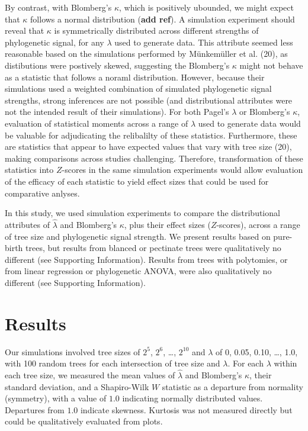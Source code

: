 \documentclass[]{article}
\begin{document}
By contrast, with Blomberg's \(\kappa\), which is positively ubounded,
we might expect that \(\kappa\) follows a normal distribution
(\textbf{add ref}). A simulation experiment should reveal that
\(\kappa\) is symmetrically distributed across different strengths of
phylogenetic signal, for any \(\lambda\) used to generate data. This
attribute seemed less reasonable based on the simulations performed by
Münkemüller et al. (20), as distibutions were postively skewed,
suggesting the Blomberg's \(\kappa\) might not behave as a statistic
that follows a noraml distribution. However, because their simulations
used a weighted combination of simulated phylogenetic signal strengths,
strong inferences are not possible (and distributional attributes were
not the intended result of their simulations). For both Pagel's
\(\lambda\) or Blomberg's \(\kappa\), evaluation of statistical moments
across a range of \(\lambda\) used to generate data would be valuable
for adjudicating the relibalilty of these statistics. Furthermore, these
are statistics that appear to have expected values that vary with tree
size (20), making comparisons across studies challenging. Therefore,
transformation of these statistics into \(Z\)-scores in the same
simulation experiments would allow evaluation of the efficacy of each
statistic to yield effect sizes that could be used for comparative
anlyses. \hfill\break

In this study, we used simulation experiments to compare the
distributional attributes of \(\hat{\lambda}\) and Blomberg's
\(\kappa\), plus their effect sizes (\(Z\)-scores), across a range of
tree size and phylogenetic signal strength. We present results based on
pure-birth trees, but results from blanced or pectinate trees were
qualitatively no different (see Supporting Information). Results from
trees with polytomies, or from linear regression or phylogenetic ANOVA,
were also qualitatively no different (see Supporting Information).

\hypertarget{results}{%
\section{Results}\label{results}}

Our simulations involved tree sizes of \(2^5\), \(2^6\), \ldots{},
\(2^{10}\) and \(\lambda\) of 0, 0.05, 0.10, \ldots{}, 1.0, with 100
random trees for each intersection of tree size and \(\lambda\). For
each \(\lambda\) within each tree size, we measured the mean values of
\(\hat{\lambda}\) and Blomberg's \(\kappa\), their standard deviation,
and a Shapiro-Wilk \(W\) statistic as a departure from normality
(symmetry), with a value of \(1.0\) indicating normally distributed
values. Departures from \(1.0\) indicate skewness. Kurtosis was not
measured directly but could be qualitatively evaluated from plots.
\hfill\break
\end{document}
